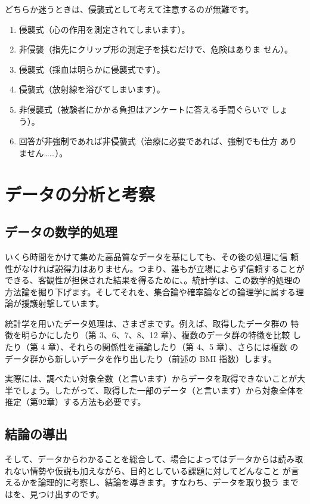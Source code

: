 \begin{simA}
どちらか迷うときは、侵襲式として考えて注意するのが無難です。
\medskip
\begin{enumerate}[label=(\arabic*)]
\item 侵襲式（心の作用を測定されてしまいます）。 
\item 非侵襲（指先にクリップ形の測定子を挟むだけで、危険はありま せん）。 
\item 侵襲式（採血は明らかに侵襲式です）。
\item 侵襲式（放射線を浴びてしまいます）。
\item 非侵襲式（被験者にかかる負担はアンケートに答える手間ぐらいで しょう）。
\item 回答が非強制であれば非侵襲式（治療に必要であれば、強制でも仕方 ありません……）。
\end{enumerate}
\end{simA}

\section{データの分析と考察}

\subsection{データの数学的処理}
いくら時間をかけて集めた高品質なデータを基にしても、その後の処理に信 頼性がなければ説得力はありません。つまり、誰もが立場によらず信頼することができる、客観性が担保された結果を得るために、。統計学は、この数学的処理の方法論を掘り下げます。そしてそれを、集合論や確率論などの論理学に属する理論が援護射撃しています。

統計学を用いたデータ処理は、さまざまです。例えば、取得したデータ群の 特徴を明らかにしたり（第 3、6、7、8、12 章）、複数のデータ群の特徴を比較 したり（第 4 章）、それらの関係性を議論したり（第 4、5 章）、さらには複数 のデータ群から新しいデータを作り出したり（前述の BMI 指数）します。

実際には、調べたい対象全数（と言います）からデータを取得できないことが大半でしょう。したがって、取得した一部のデータ（と言います）から対象全体を推定（第9\tildeto2章）する方法も必要です。

\subsection{結論の導出}
そして、データからわかることを総合して、場合によってはデータからは読み取れない情勢や仮説も加えながら、目的としている課題に対してどんなこと が言えるかを論理的に考察し、結論を導きます。すなわち、データを取り扱う まではを、見つけ出すのです。

